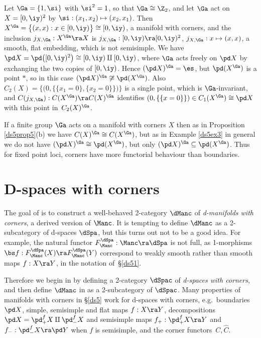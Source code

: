 \documentclass{article}
\begin{document}
\begin{ex} Let $\Ga=\{1,\si\}$ with $\si^2=1$, so that
$\Ga\cong\Z_2$, and let $\Ga$ act on $X=[0,\iy)^2$ by
$\si:(x_1,x_2)\mapsto (x_2,x_1)$. Then
$X^\Ga=\bigl\{(x,x):x\in[0,\iy)\bigr\}\cong [0,\iy)$, a manifold
with corners, and the inclusion $j_{X,\Ga}:X^\Ga\ra X$ is
$j_{X,\Ga}:[0,\iy)\ra [0,\iy)^2$, $j_{X,\Ga}:x\mapsto(x,x)$, a
smooth, flat embedding, which is not semisimple. We have $\pd
X=\pd\bigl([0,\iy)^2\bigr)\cong [0,\iy)\amalg[0,\iy)$, where $\Ga$
acts freely on $\pd X$ by exchanging the two copies of $[0,\iy)$.
Hence $(\pd X)^\Ga=\es$, but $\pd(X^\Ga)$ is a point $*$, so in this
case $(\pd X)^\Ga\not\cong\pd(X^\Ga)$. Also
$C_2(X)=\bigl\{\bigl(0,\{\{x_1=0\}, \{x_2=0\}\}\bigr)\bigr\}$ is a
single point, which is $\Ga$-invariant, and
$C(j_{X,\Ga}):C(X^\Ga)\ra C(X)^\Ga$ identifies $(0,\{\{x=0\}\})\in
C_1(X^\Ga)\cong\pd X$ with this point in~$C_2(X)^\Ga$.
\label{ds5ex3}
\end{ex}

If a finite group $\Ga$ acts on a manifold with corners $X$ then as
in Proposition \ref{ds5prop5}(b) we have $C(X)^\Ga\cong C(X^\Ga)$,
but as in Example \ref{ds5ex3} in general we do not have $(\pd
X)^\Ga\cong\pd (X^\Ga)$, but only $(\pd X)^\Ga\subseteq\pd (X^\Ga)$.
Thus for fixed point loci, corners have more functorial behaviour
than boundaries.

\section{D-spaces with corners}
\label{ds6}

The goal of \cite[Chap.s 6 \& 7]{Joyc6} is to construct a
well-behaved 2-category $\dManc$ of {\it d-manifolds with corners},
a derived version of $\Manc$. It is tempting to define $\dManc$ as a
2-subcategory of d-spaces $\dSpa$, but this turns out not to be a
good idea. For example, the natural functor
$F_\Manc^\dSpa:\Manc\ra\dSpa$ is not full, as 1-morphisms $\bs
f:F_\Manc^\dSpa(X)\ra F_\Manc^\dSpa(Y)$ correspond to weakly smooth
rather than smooth maps $f:X\ra Y$, in the notation of~\S\ref{ds51}.

Therefore we begin in \cite[Chap.~6]{Joyc6} by defining a 2-category
$\dSpac$ of {\it d-spaces with corners}, and then define $\dManc$ in
\cite[Chap.~7]{Joyc6} as a 2-subcategory of $\dSpac$. Many
properties of manifolds with corners in \S\ref{ds5} work for
d-spaces with corners, e.g.\ boundaries $\pd X$, simple, semisimple
and flat maps $f:X\ra Y$, decompositions $\pd
X=\pd^f_+X\amalg\pd^f_-X$ and semisimple maps $f_+:\pd_+^fX\ra Y$
and $f_-:\pd_-^fX\ra\pd Y$ when $f$ is semisimple, and the corner
functors~$C,\hat C$.
\end{document}
